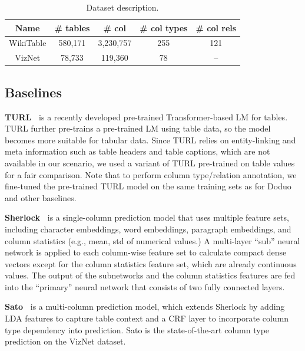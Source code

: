 \documentclass[sigconf]{acmart}
\newcommand{\name}{\mbox{\sc Doduo}}
\newcommand{\rev}[1]{#1}
\begin{document}
\begin{table}[]
    \centering
    \footnotesize
    \caption{ Dataset description.}\label{tab:datasets}    \vspace{-1em}
    \begin{tabular}{c|cccc}\hline
     Name      & \# tables & \# col & \# col types & \# col rels\\\hline\hline
     WikiTable & 580,171 & 3,230,757  & 255 & 121 \\
     VizNet & 78,733 & 119,360 & 78 & -- \\\hline
    \end{tabular}
    \vspace{-2em}
\end{table}



\subsection{Baselines}
\noindent
{\bf TURL~\cite{Deng:2020:TURL}} is a recently developed pre-trained Transformer-based LM for tables. TURL further pre-trains a pre-trained LM using table data, so the model becomes more suitable for tabular data. 
%
Since TURL relies on entity-linking and meta information such as table headers and table captions, which are not available in our scenario, we used a variant of TURL \rev{pre-trained on} table values for a fair comparison. \rev{Note that to perform column type/relation annotation, we fine-tuned the pre-trained TURL model on the same training sets
as for \name{} and other baselines.}

\noindent
{\bf Sherlock~\cite{Hulsebos:2019:Sherlock}} is a single-column prediction model that uses multiple feature sets, including character embeddings, word embeddings, paragraph embeddings, and column statistics (e.g., mean, std of numerical values.)
%
A multi-layer ``sub'' neural network is applied to each column-wise feature set to calculate compact dense vectors except for the column statistics feature set, which are already continuous values. The output of the subnetworks and the column statistics features are fed into the ``primary'' neural network that consists of two fully connected layers. 

\noindent
{\bf Sato~\cite{Zhang:2020:Sato}} is a multi-column prediction model, which extends Sherlock by adding LDA features to capture table context and a CRF layer to incorporate column type dependency into prediction.
%
Sato is the state-of-the-art column type prediction on the VizNet dataset. 
\end{document}
